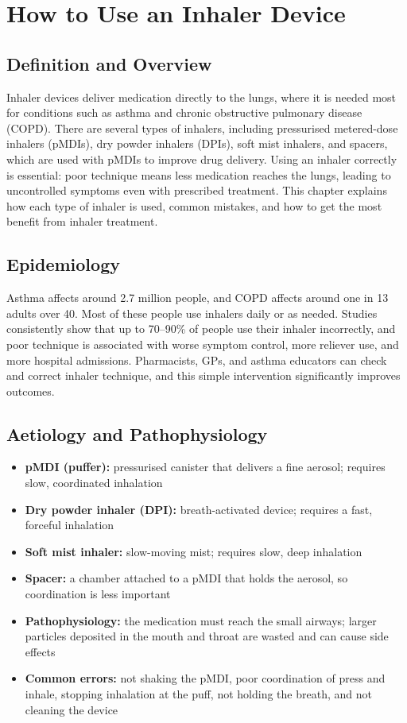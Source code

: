 \chapter{How to Use an Inhaler Device}

\section*{Definition and Overview}
Inhaler devices deliver medication directly to the lungs, where it is needed most for conditions such as asthma and chronic obstructive pulmonary disease (COPD). There are several types of inhalers, including pressurised metered-dose inhalers (pMDIs), dry powder inhalers (DPIs), soft mist inhalers, and spacers, which are used with pMDIs to improve drug delivery. Using an inhaler correctly is essential: poor technique means less medication reaches the lungs, leading to uncontrolled symptoms even with prescribed treatment. This chapter explains how each type of inhaler is used, common mistakes, and how to get the most benefit from inhaler treatment.

\section*{Epidemiology}
Asthma affects around 2.7 million people, and COPD affects around one in 13 adults over 40. Most of these people use inhalers daily or as needed. Studies consistently show that up to 70--90\% of people use their inhaler incorrectly, and poor technique is associated with worse symptom control, more reliever use, and more hospital admissions. Pharmacists, GPs, and asthma educators can check and correct inhaler technique, and this simple intervention significantly improves outcomes.

\section*{Aetiology and Pathophysiology}
\begin{itemize}
    \item \textbf{pMDI (puffer):} pressurised canister that delivers a fine aerosol; requires slow, coordinated inhalation
    \item \textbf{Dry powder inhaler (DPI):} breath-activated device; requires a fast, forceful inhalation
    \item \textbf{Soft mist inhaler:} slow-moving mist; requires slow, deep inhalation
    \item \textbf{Spacer:} a chamber attached to a pMDI that holds the aerosol, so coordination is less important
    \item \textbf{Pathophysiology:} the medication must reach the small airways; larger particles deposited in the mouth and throat are wasted and can cause side effects
    \item \textbf{Common errors:} not shaking the pMDI, poor coordination of press and inhale, stopping inhalation at the puff, not holding the breath, and not cleaning the device
\end{itemize}


